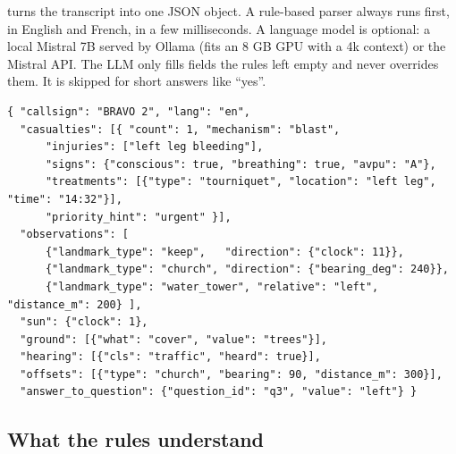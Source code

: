  turns the transcript into one JSON object. A rule-based parser always
runs first, in English and French, in a few milliseconds. A language model is optional: a local
Mistral 7B served by Ollama (fits an 8 GB GPU with a 4k context) or the Mistral API. The LLM only
fills fields the rules left empty and never overrides them. It is skipped for short answers like
``yes''.

\begin{lstlisting}[caption={Extraction output (abridged).},label=lst:schema]
{ "callsign": "BRAVO 2", "lang": "en",
  "casualties": [{ "count": 1, "mechanism": "blast",
      "injuries": ["left leg bleeding"],
      "signs": {"conscious": true, "breathing": true, "avpu": "A"},
      "treatments": [{"type": "tourniquet", "location": "left leg", "time": "14:32"}],
      "priority_hint": "urgent" }],
  "observations": [
      {"landmark_type": "keep",   "direction": {"clock": 11}},
      {"landmark_type": "church", "direction": {"bearing_deg": 240}},
      {"landmark_type": "water_tower", "relative": "left", "distance_m": 200} ],
  "sun": {"clock": 1},
  "ground": [{"what": "cover", "value": "trees"}],
  "hearing": [{"cls": "traffic", "heard": true}],
  "offsets": [{"type": "church", "bearing": 90, "distance_m": 300}],
  "answer_to_question": {"question_id": "q3", "value": "left"} }
\end{lstlisting}

\subsection{What the rules understand}

